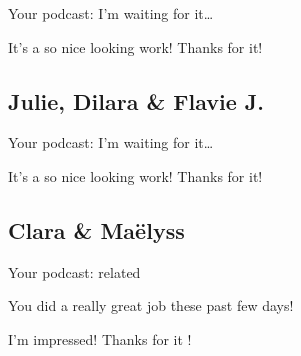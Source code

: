 \documentclass[12pt,oneside]{report}
\begin{document}
\begin{spacing}{1.2}
Your podcast: I'm waiting for it\dots

\color{blue}
It's a so nice looking work! Thanks for it!
\color{black}

\subsection*{Julie, Dilara \& Flavie J.}

Your podcast: I'm waiting for it\dots

\color{blue}
It's a so nice looking work! Thanks for it!
\color{black}

\subsection*{Clara \& Maëlyss}

Your podcast: related

\color{blue}
You did a really great job these past few days!

I'm impressed! Thanks for it !
\color{black}


\end{spacing}
\end{document}
